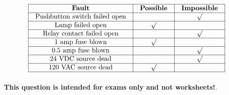 \vfil 

\eject







$$\vbox{\offinterlineskip
\halign{\strut
\vrule \quad\hfil # \ \hfil & 
\vrule \quad\hfil # \ \hfil & 
\vrule \quad\hfil # \ \hfil \vrule \cr
\noalign{\hrule}
%
{\bf Fault} & {\bf Possible} & {\bf Impossible} \cr
%
\noalign{\hrule}
%
Pushbutton switch failed open &  & $\surd$ \cr
%
\noalign{\hrule}
%
Lamp failed open & $\surd$ &  \cr
%
\noalign{\hrule}
%
Relay contact failed open &  & $\surd$ \cr
%
\noalign{\hrule}
%
1 amp fuse blown & $\surd$ &  \cr
%
\noalign{\hrule}
%
0.5 amp fuse blown &  & $\surd$ \cr
%
\noalign{\hrule}
%
24 VDC source dead &  & $\surd$ \cr
%
\noalign{\hrule}
%
120 VAC source dead & $\surd$ &  \cr
%
\noalign{\hrule}
} %
}$$ %








{\bf This question is intended for exams only and not worksheets!}.


